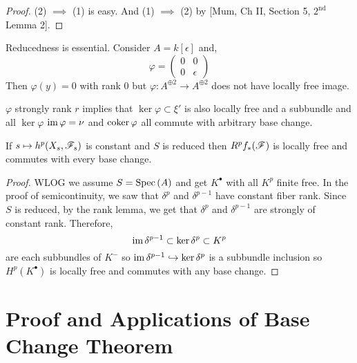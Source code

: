\documentclass[12pt]{article}
\begin{document}
\begin{proof}
(2) $\implies$ (1) is easy. And (1) $\implies$ (2) by [Mum, Ch II, Section 5, $2^{\text{nd}}$ Lemma 2]. 
\end{proof}

\begin{remark}
Reducedness is essential. Consider $A = k[\epsilon]$ and,
\[ \varphi = 
\begin{pmatrix}
0 & 0 
\\
0 & \epsilon 
\end{pmatrix} \]
Then $\varphi(y) = 0$ with rank $0$ but $\varphi : A^{\oplus 2} \to A^{\oplus 2}$ does not have locally free image. 
\end{remark}

\begin{remark}
$\varphi$ strongly rank $r$ implies that $\ker{\varphi} \subset \xi'$ is also locally free and a subbundle and all $\ker{\varphi}$ $\operatorname{\mathrm{im}}{\varphi} = \nu$ and $\operatorname{\mathrm{coker}}{\varphi}$ all commute with arbitrary base change.  
\end{remark}

\begin{theorem}[Grauert]
If $s \mapsto h^p(X_s, \mathscr{F}_s)$ is constant and $S$ is reduced then $R^p f_*(\mathscr{F})$ is locally free and commutes with every base change. 
\end{theorem}

\begin{proof}
WLOG we assume $S = \mathrm{Spec}\left( A \right)$ and get $K^\bullet$ with all $K^p$ finite free. In the proof of semicontinuity, we saw that $\delta^p$ and $\delta^{p-1}$ have constant fiber rank. Since $S$ is reduced, by the rank lemma, we get that $\delta^p$ and $\delta^{p-1}$ are strongly of constant rank. Therefore,
\[ \operatorname{\mathrm{im}}{\delta^{p-1}} \subset \ker{\delta^p} \subset K^p \]
are each subbundles of $K^-$ so $\operatorname{\mathrm{im}}{\delta^{p-1}} \hookrightarrow \ker{\delta^p}$ is a subbundle inclusion so $H^p(K^\bullet)$ is locally free and commutes with any base change.  
\end{proof}

\section{Proof and Applications of Base Change Theorem}
\end{document}
